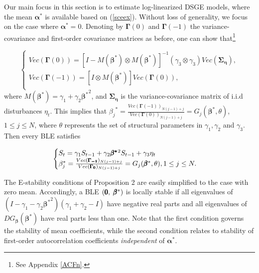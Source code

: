 \noindent
Our main focus in this section is to estimate log-linearized DSGE models, where the mean $\pmb{\alpha^{*}}$ is available based on (\ref{sceex}). Without loss of generality, we focus on the case where $\pmb{\alpha^{*}} = 0 $. Denoting by $\pmb{\Gamma}(0)$ and $\pmb{\Gamma}(-1)$ the variance-covariance and first-order covariance matrices as before, one can show that\footnote{See Appendix \ref{ACFn}.}

\begin{equation}
\begin{cases}
Vec(\pmb{\Gamma}(0))  = [I - M(\pmb{ \beta^{*}}) \otimes M(\pmb{\beta^{*}}) ]^{-1} (\gamma_3 \otimes \gamma_3  ) Vec(\pmb{\Sigma_{\eta}}), \\
Vec(\pmb{\Gamma}(-1))= [I \otimes M(\pmb{\beta^{*}})] Vec(\pmb{\Gamma}(0)),\\
\end{cases}
\label{eqn:2_13}
\end{equation}
\noindent
where $M(\pmb{\beta}^{*})=\gamma_1+\gamma_2 \pmb{{\beta}^{*}}^2$, and $\pmb{\Sigma_{\eta}}$ is the variance-covariance matrix of i.i.d disturbances $\eta_t$. This implies that ${\beta_j}^{*} = \frac{Vec(\pmb{\Gamma}(-1))_{N(j-1)+j}}{Vec(\pmb{\Gamma}(0))_{N(j-1)+j}} =G_j( \pmb{\beta}^{*},\theta)$, $1 \leq j \leq N$, where $\theta$ represents the set of structural parameters in $\gamma_1, \gamma_2$ and $\gamma_3$. Then every {BLE} satisfies

\begin{equation}
\begin{cases}    
S_t = \gamma_1 S_{t-1} + \gamma_2 \pmb{{\beta}^{*}}^2 S_{t-1} + \gamma_3 \eta_t \\
\beta_j^{*} = \frac{Vec(\pmb{\Gamma_{-1}})_{N(j-1)+j}}{Vec(\pmb{\Gamma_0})_{N(j-1)+j}} =G_j(\pmb{ \beta}^{*},\theta), 1 \leq j \leq N.\\
\end{cases} \\
\label{eqn:prop2_1}
\end{equation}

\noindent
The E-stability conditions of Proposition 2 are easily simplified to the case with zero mean. Accordingly, a {BLE} $(\pmb{0},  \hspace{1 mm} \pmb{\beta}^{*})$ is locally stable if all eigenvalues of $(I-\gamma_1-\gamma_2 \pmb{ {\beta}^{*}}^2)(\gamma_1+\gamma_2-I)$ have negative real parts and all eigenvalues of $DG_{\pmb{\beta}}(\pmb{\beta}^{*})$ have real parts less than one. Note that the first condition governs the stability of mean coefficients, while the second condition relates to stability of first-order autocorrelation coefficients {\it independent} of $\pmb{\alpha^{*}}$.\\


